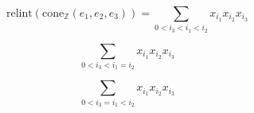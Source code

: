 $$\mathrm{relint}(\mathrm{cone}_\mathbb{Z}(e_1,e_2,e_3)) = \sum_{0 < i_3 < i_1 < i_2} x_{i_1}x_{i_2}x_{i_3}$$

$$\sum_{0 < i_3 < i_1 = i_2} x_{i_1}x_{i_2}x_{i_3}$$

$$\sum_{0 < i_3 = i_1 < i_2} x_{i_1}x_{i_2}x_{i_3}$$
